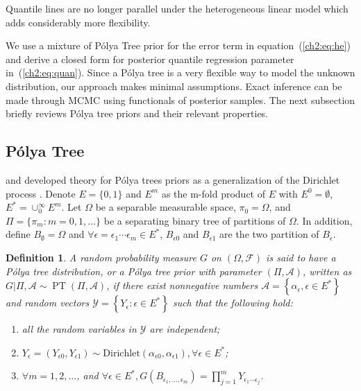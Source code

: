 \documentclass[12pt]{article}
\newtheorem{deff}[thm]{Definition}
\newcommand{\polya}{P\'{o}lya}
\DeclareMathOperator{\pt}{PT}
\begin{document}
Quantile lines are no longer parallel under the heterogeneous linear
model which adds considerably more flexibility.

We use a mixture of \polya{} Tree prior for the error term in equation~(\ref{ch2:eq:he})
 and derive a closed form for posterior quantile
regression parameter in~(\ref{ch2:eq:quan}).  Since a \polya{} tree is a
very flexible way to model the unknown distribution, our approach
makes minimal assumptions.  Exact inference can be made through MCMC using
functionals of posterior samples. The next subsection briefly reviews
\polya{} tree priors and their relevant properties.

\subsection{\polya{} Tree}
\citet{lavine1992, lavine1994} and \citet{mauldin1992} developed
theory for \polya{} trees priors as a generalization of the Dirichlet
process \citep{ferguson1974}. Denote $E=\{0,1\}$ and $E^m$ as the
m-fold product of $E$ with $E^0= \emptyset$, $E^{*} = \cup_0^{\infty} E^m$.
Let $\Omega$ be a separable measurable space, $\pi_0 = \Omega$, and $\Pi=
\{ \pi_m: m=0,1, \ldots \} $ be a separating binary tree of partitions
of $\Omega$. In addition, define $B_{\emptyset} = \Omega$ and $\forall
\epsilon=\epsilon_1\cdots \epsilon_m \in E^{*}$, $B_{\epsilon 0}$ and
$B_{\epsilon 1}$ are the two partition of $B_{\epsilon}$.
\begin{deff}
  A random probability measure $G$ on $(\Omega, \mathcal{F})$ is said
  to have a \polya{} tree distribution, or a \polya{} tree prior with
  parameter $(\Pi, \mathcal{A})$, written as $G|\Pi, \mathcal{A} \sim
  \pt (\Pi, \mathcal{A})$, if there exist nonnegative numbers
  $\mathcal{A}= \left\{ \alpha_{\epsilon}, \epsilon \in E^{*}
  \right\}$ and random vectors $\mathcal{Y} = \left\{ Y_{\epsilon} :
    \epsilon \in E^{*} \right\}$ such that the following hold:
  \begin{enumerate}
  \item\label{ch2:item:1} all the random variables in $\mathcal{Y}$ are
    independent;
  \item $Y_{\epsilon}= (Y_{\epsilon 0}, Y_{\epsilon 1}) \sim
    \mathrm{Dirichlet}(\alpha_{\epsilon 0 }, \alpha_{\epsilon 1}),
    \forall \epsilon \in E^{*}$;
  \item $\forall m=1,2, \ldots$, and $\forall \epsilon \in E^{*},
    G(B_{\epsilon_{1}, \ldots, \epsilon_m}) = \prod_{j=1}^m
    Y_{\epsilon_1 \cdots \epsilon_j}$.
  \end{enumerate}
\end{deff}
\end{document}
